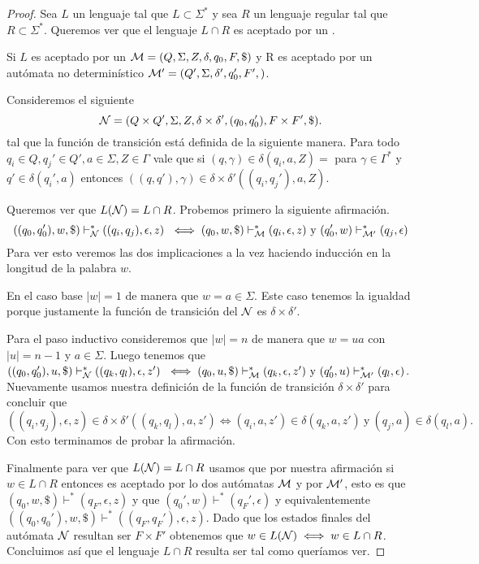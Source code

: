 \documentclass[tesis.tex]{subfiles}
\begin{document}
\begin{proof}
	Sea $L$ un lenguaje \ic tal que $L \subset \Sigma^*$ y sea $R$ un lenguaje regular tal que $R \subset \Sigma^*$. 
	Queremos ver que el lenguaje $L \cap R$ es aceptado por un \APND.
	
	Si $L$ es aceptado por un \APND ${\cal M } = (Q, \Sigma, Z, \delta, q_0, F, \$)$ y R es aceptado por un autómata no determinístico ${\cal M' } = (Q', \Sigma, \delta', q_0', F',)$.
	
	Consideremos el siguiente \APND
	\[
		{\cal N } = (Q \times Q', \Sigma, Z, \delta \times \delta', (q_0,q_0'), F \times F', \$).
	\]	
	tal que la función de transición está definida de la siguiente manera.
	Para todo $q_{i} \in Q, q_{j}' \in Q', a \in \Sigma, Z \in \Gamma$ vale que
	si $(q,\gamma) \in \delta(q_{i},a,Z) = $ para $\gamma \in \Gamma^*$ y $q'  \in \delta(q_{i}', a)$ entonces $ ((q,q'), \gamma) \in \delta \times \delta'((q_{i},q_{j}'),a,Z)$.
	
	
	Queremos ver que $L({\cal N}) = L \cap R $.	
	Probemos primero la siguiente afirmación.
	\[
	((q_0,q_0'), w, \$) \vdash^*_{\cal N}  ((q_i,q_j), \epsilon, z) \ \iff (q_0, w, \$) \vdash^*_{\cal M}  (q_i, \epsilon, z) \ \text{y} \ (q_0', w) \vdash^*_{\cal M'} (q_j, \epsilon)  	
	\]
	Para ver esto veremos las dos implicaciones a la vez haciendo inducción en la longitud de la palabra $w$.
	
	En el caso base $|w| = 1$ de manera que $w = a \in \Sigma$.
	Este caso tenemos la igualdad porque justamente la función de transición del \APND $\cal N$ es $\delta \times \delta'$.
	
	Para el paso inductivo consideremos que $|w|=n$ de manera que $w=ua$ con $|u|=n-1$ y $a \in \Sigma$.
	Luego tenemos que $((q_0,q_0'), u, \$) \vdash^*_{\cal N}  ((q_k,q_l), \epsilon, z') \ \iff (q_0, u, \$) \vdash^*_{\cal M}  (q_k, \epsilon, z') \ \text{y} \ (q_0', u) \vdash^*_{\cal M'} (q_l, \epsilon)$.
	Nuevamente usamos nuestra definición de la función de transición $\delta \times \delta'$ para concluir que
	\[ 
	((q_i,q_j),\epsilon, z) \in \delta \times \delta'((q_k,q_l), a, z') \iff  (q_i, a, z') \in \delta(q_k, a, z') \ \text{y} \ (q_j, a) \in \delta(q_l, a).
	\]	
	Con esto terminamos de probar la afirmación.
	
	Finalmente para ver que $L({\cal N})  =  L \cap R$ usamos que por nuestra afirmación si $w \in L \cap R$ entonces es aceptado por lo dos autómatas $\cal M$ y por $\cal M'$, esto es que $(q_0, w, \$) \vdash^* (q_F, \epsilon, z)$ y que $(q_0', w) \vdash^* (q_F', \epsilon)$ y equivalentemente $((q_0,q_0'),w,\$) \vdash^* ((q_F, q_F'),\epsilon, z)$. 
	Dado que los estados finales del autómata $\cal N$ resultan ser $F \times F'$ obtenemos que $w \in L({\cal N}) \iff w \in L \cap R$.
	Concluimos así que el lenguaje $L \cap R$ resulta ser \ic tal como queríamos ver.		
\end{proof}
\end{document}
